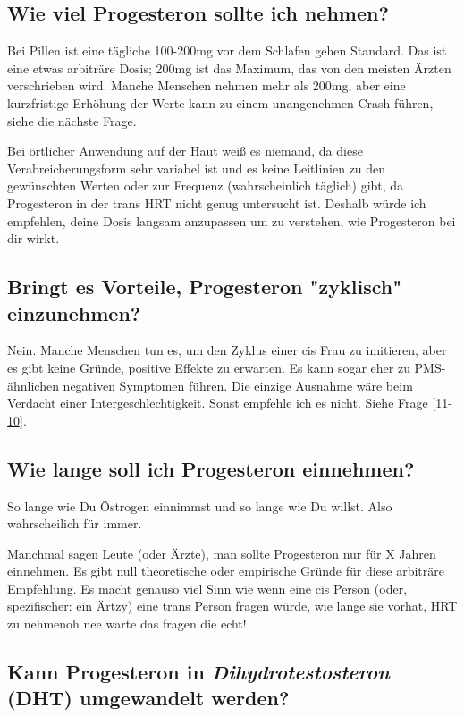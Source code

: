\documentclass{article}
\begin{document}
{{\subsection{Wie viel Progesteron sollte ich nehmen?}

Bei Pillen ist eine tägliche 100-200mg vor dem Schlafen gehen Standard. Das ist eine etwas arbiträre Dosis; 200mg ist das Maximum, das von den meisten Ärzten verschrieben wird. Manche Menschen nehmen mehr als 200mg, aber eine kurzfristige Erhöhung der Werte kann zu einem unangenehmen Crash führen, siehe die nächste Frage.

Bei örtlicher Anwendung auf der Haut weiß es niemand, da diese Verabreicherungsform sehr variabel ist und es keine Leitlinien zu den gewünschten Werten oder zur Frequenz (wahrscheinlich täglich) gibt, da Progesteron in der trans HRT nicht genug untersucht ist. Deshalb würde ich empfehlen, deine Dosis langsam anzupassen um zu verstehen, wie Progesteron bei dir wirkt.

\subsection{Bringt es Vorteile, Progesteron "zyklisch" einzunehmen?}\label{8-11}

Nein. Manche Menschen tun es, um den Zyklus einer cis Frau zu imitieren, aber es gibt keine Gründe, positive Effekte zu erwarten. Es kann sogar eher zu PMS-ähnlichen negativen Symptomen führen. Die einzige Ausnahme wäre beim Verdacht einer Intergeschlechtigkeit. Sonst empfehle ich es nicht. Siehe Frage \ref{11-10}.

\subsection{Wie lange soll ich Progesteron einnehmen?}

So lange wie Du Östrogen einnimmst und so lange wie Du willst. Also wahrscheilich für immer.

Manchmal sagen Leute (oder Ärzte), man sollte Progesteron nur für X Jahren einnehmen. Es gibt null theoretische oder empirische Gründe für diese arbiträre Empfehlung. Es macht genauso viel Sinn wie wenn eine cis Person (oder, spezifischer: ein Ärtzy) eine trans Person fragen würde, wie lange sie vorhat, HRT zu nehmen\textemdash{}oh nee warte das fragen die echt!

\subsection{Kann Progesteron in \textit{Dihydrotestosteron} (DHT) umgewandelt werden?}

}}
\end{document}
